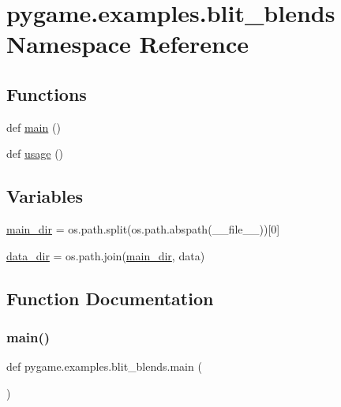 \hypertarget{namespacepygame_1_1examples_1_1blit__blends}{}\section{pygame.\+examples.\+blit\+\_\+blends Namespace Reference}
\label{namespacepygame_1_1examples_1_1blit__blends}
\subsection*{Functions}
\begin{DoxyCompactItemize}
\item 
def \hyperlink{namespacepygame_1_1examples_1_1blit__blends_a123191f840f03e905660cc71d27a2007}{main} ()
\item 
def \hyperlink{namespacepygame_1_1examples_1_1blit__blends_aea4b6617fa09629dbe966bb07eef4f55}{usage} ()
\end{DoxyCompactItemize}
\subsection*{Variables}
\begin{DoxyCompactItemize}
\item 
\hyperlink{namespacepygame_1_1examples_1_1blit__blends_aae21a919dc788347418cd3dc61086b36}{main\+\_\+dir} = os.\+path.\+split(os.\+path.\+abspath(\+\_\+\+\_\+file\+\_\+\+\_\+))\mbox{[}0\mbox{]}
\item 
\hyperlink{namespacepygame_1_1examples_1_1blit__blends_a443b6f80d85392ca82638f093e3cf864}{data\+\_\+dir} = os.\+path.\+join(\hyperlink{namespacepygame_1_1examples_1_1blit__blends_aae21a919dc788347418cd3dc61086b36}{main\+\_\+dir}, \textquotesingle{}data\textquotesingle{})
\end{DoxyCompactItemize}


\subsection{Function Documentation}
\mbox{\label{namespacepygame_1_1examples_1_1blit__blends_a123191f840f03e905660cc71d27a2007}} 
\subsubsection{\texorpdfstring{main()}{main()}}
{\footnotesize\ttfamily def pygame.\+examples.\+blit\+\_\+blends.\+main (\begin{DoxyParamCaption}{ }\end{DoxyParamCaption})}

